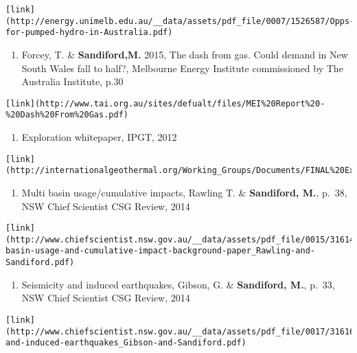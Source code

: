 \documentclass[
]{article}
\providecommand{\tightlist}{%
  \setlength{\itemsep}{0pt}\setlength{\parskip}{0pt}}
\begin{document}
\begin{verbatim}
[link](http://energy.unimelb.edu.au/__data/assets/pdf_file/0007/1526587/Opps-for-pumped-hydro-in-Australia.pdf)
\end{verbatim}

\begin{enumerate}
\def\labelenumi{\arabic{enumi}.}
\tightlist
\item
  Forcey, T. \& \textbf{Sandiford,M.} 2015, The dash from gas. Could
  demand in New South Wales fall to half?, Melbourne Energy Institute
  commissioned by The Australia Institute, p.30
\end{enumerate}

\begin{verbatim}
[link](http://www.tai.org.au/sites/defualt/files/MEI%20Report%20-%20Dash%20From%20Gas.pdf)
\end{verbatim}

\begin{enumerate}
\def\labelenumi{\arabic{enumi}.}
\tightlist
\item
  Exploration whitepaper, IPGT, 2012
\end{enumerate}

\begin{verbatim}
[link](http://internationalgeothermal.org/Working_Groups/Documents/FINAL%20Exploration%20Working%20Group%20Whitepaper%20August%202012.pdf)
\end{verbatim}

\begin{enumerate}
\def\labelenumi{\arabic{enumi}.}
\tightlist
\item
  Multi basin usage/cumulative impacts, Rawling T. \& \textbf{Sandiford,
  M.}, p.~38, NSW Chief Scientist CSG Review, 2014
\end{enumerate}

\begin{verbatim}
[link](http://www.chiefscientist.nsw.gov.au/__data/assets/pdf_file/0015/31614/Multi-basin-usage-and-cumulative-impact-background-paper_Rawling-and-Sandiford.pdf)
\end{verbatim}

\begin{enumerate}
\def\labelenumi{\arabic{enumi}.}
\tightlist
\item
  Seismicity and induced earthquakes, Gibson, G. \& \textbf{Sandiford,
  M.}, p.~33, NSW Chief Scientist CSG Review, 2014
\end{enumerate}

\begin{verbatim}
[link](http://www.chiefscientist.nsw.gov.au/__data/assets/pdf_file/0017/31616/Seismicity-and-induced-earthquakes_Gibson-and-Sandiford.pdf)
\end{verbatim}
\end{document}
